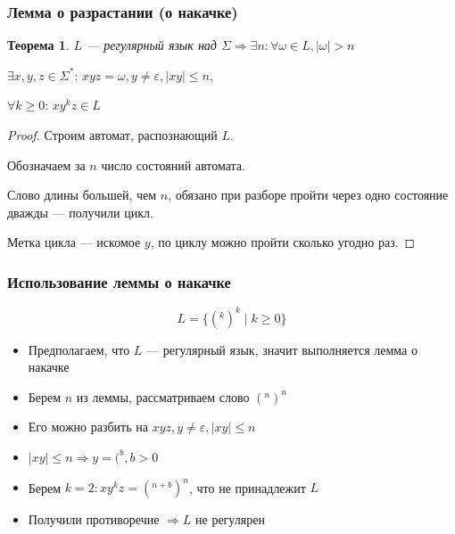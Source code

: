\documentclass{beamer}
\newtheorem{rutheorem}{Теорема}
\begin{document}
\begin{frame}[fragile]
  \transwipe[direction=90]
  \frametitle{Лемма о разрастании (о накачке)}
  \begin{rutheorem}
  $L$ --- регулярный язык над $\Sigma \Rightarrow \exists n: \forall \omega \in L, | \omega | > n$

    $\exists x, y, z \in \Sigma^*: \, xyz = \omega, y \neq \varepsilon, |xy| \leq n,$

     $ \forall k \geq 0: \, x y^k z \in L$
  \end{rutheorem}

  \begin{proof}
  Строим автомат, распознающий $L$.

  Обозначаем за $n$ число состояний автомата.

  Слово длины большей, чем $n$, обязано при разборе пройти через одно состояние дважды --- получили цикл.

  Метка цикла --- искомое $y$, по циклу можно пройти сколько угодно раз.

  \end{proof}

\end{frame}


\begin{frame}[fragile]
  \transwipe[direction=90]
  \frametitle{Использование леммы о накачке}

  \[ L = \{ (^k )^k \mid k \geq 0\} \]

  \begin{itemize}
    \item Предполагаем, что $L$ --- регулярный язык, значит выполняется лемма о накачке
    \item Берем $n$ из леммы, рассматриваем слово $(^n )^n$
    \item Его можно разбить на $xyz, y \neq \varepsilon, |xy| \leq n$
    \item $|xy| \leq n \Rightarrow y = (^b, b > 0$
    \item Берем $k = 2: xy^kz = (^{n+b} )^n$, что не принадлежит $L$
    \item Получили противоречие $\Rightarrow L$  не регулярен
  \end{itemize}

\end{frame}
\end{document}
